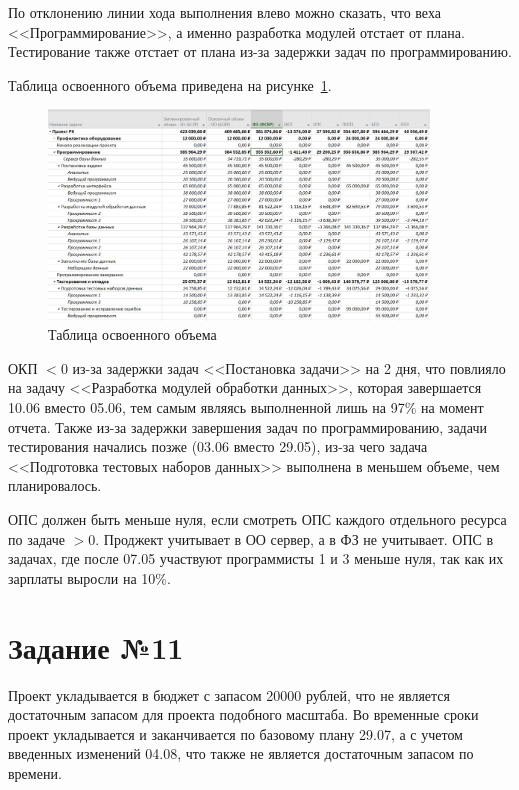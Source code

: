 По отклонению линии хода выполнения влево можно сказать, что веха <<Программирование>>, а именно разработка модулей отстает от плана. Тестирование также отстает от плана из-за задержки задач по программированию.

Таблица освоенного объема приведена на рисунке~\ref{fig:screen10_10}.

\begin{figure}[H]
	\centering
	\includegraphics[width=0.9\textwidth]{img/task10/screen10_10.jpg}
	\caption{Таблица освоенного объема}
	\label{fig:screen10_10}
\end{figure}

ОКП $< 0$ из-за задержки задач <<Постановка задачи>> на 2 дня, что повлияло на задачу <<Разработка модулей обработки данных>>, которая завершается 10.06 вместо 05.06, тем самым являясь выполненной лишь на 97\% на момент отчета.
Также из-за задержки завершения задач по программированию, задачи тестирования начались позже (03.06 вместо 29.05), из-за чего задача <<Подготовка тестовых наборов данных>> выполнена в меньшем объеме, чем планировалось.

ОПС должен быть меньше нуля, если смотреть ОПС каждого отдельного ресурса по задаче $> 0$.
Проджект учитывает в ОО сервер, а в ФЗ не учитывает.
ОПС в задачах, где после 07.05 участвуют программисты 1 и 3 меньше нуля, так как их зарплаты выросли на 10\%. 


\section{Задание №11}

Проект укладывается в бюджет с запасом 20000 рублей, что не является достаточным запасом для проекта подобного масштаба.
Во временные сроки проект укладывается и заканчивается по базовому плану 29.07, а с учетом введенных изменений 04.08, что также не является достаточным запасом по времени.

